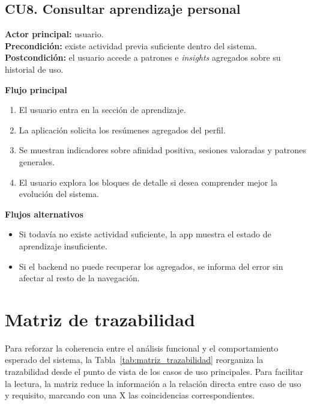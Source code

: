 \subsection{CU8. Consultar aprendizaje personal}

\textbf{Actor principal:} usuario. \\
\textbf{Precondición:} existe actividad previa suficiente dentro del sistema. \\
\textbf{Postcondición:} el usuario accede a patrones e \textit{insights}
agregados sobre su historial de uso.

\textbf{Flujo principal}
\begin{enumerate}[label=\arabic*.]
    \item El usuario entra en la sección de aprendizaje.
    \item La aplicación solicita los resúmenes agregados del perfil.
    \item Se muestran indicadores sobre afinidad positiva, sesiones valoradas y patrones generales.
    \item El usuario explora los bloques de detalle si desea comprender mejor la evolución del sistema.
\end{enumerate}

\textbf{Flujos alternativos}
\begin{itemize}
    \item Si todavía no existe actividad suficiente, la app muestra el estado de aprendizaje insuficiente.
    \item Si el backend no puede recuperar los agregados, se informa del error sin afectar al resto de la navegación.
\end{itemize}

\section{Matriz de trazabilidad}
\label{sec:matriz_trazabilidad}

Para reforzar la coherencia entre el análisis funcional y el comportamiento
esperado del sistema, la Tabla~\ref{tab:matriz_trazabilidad} reorganiza la
trazabilidad desde el punto de vista de los casos de uso principales. Para
facilitar la lectura, la matriz reduce la información a la relación directa
entre caso de uso y requisito, marcando con una X las coincidencias
correspondientes.

